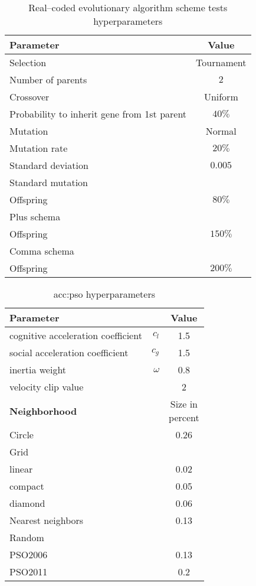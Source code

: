\begin{table}[h]
    \centering
    \begin{tabular}{|l|c|}
        \hline
        \textbf{Parameter} & \textbf{Value} \\
        \hline
        Selection & Tournament \\
        \quad Number of parents & $2$ \\
        Crossover & Uniform \\
        \quad Probability to inherit gene from 1st parent & $40\%$ \\
        Mutation & Normal \\
        \quad Mutation rate & $20\%$ \\
        \quad Standard deviation & $0.005$ \\
        \hline
        Standard mutation & \\
        \quad Offspring & $80\%$ \\
        Plus schema & \\
        \quad Offspring & $150\%$ \\
        Comma schema & \\
        \quad Offspring & $200\%$ \\
        \hline
    \end{tabular}
    \caption{Real--coded evolutionary algorithm scheme tests hyperparameters}
    \label{tab:esschemehyperparmarameters}
\end{table}

\begin{table}[h]
    \centering
    \begin{tabular}{|l r|c|}
        \hline
        \multicolumn{2}{|l|}{\textbf{Parameter}} & \textbf{Value} \\
        \hline
        cognitive acceleration coefficient & $c_l$ & 1.5 \\
        social acceleration coefficient  & $c_g$ & 1.5 \\
        inertia weight & $\omega$ & 0.8 \\
        velocity clip value & & 2 \\
        \hline \hline
        \textbf{Neighborhood} & & \makecell[c]{Size in\\ percent} \\
        \hline
        Circle & & 0.26 \\
        Grid & & \\
        \quad linear & & 0.02 \\
        \quad compact & & 0.05 \\
        \quad diamond & & 0.06 \\
        Nearest neighbors & & 0.13 \\
        Random & & \\
        \quad PSO2006 & & 0.13 \\
        \quad PSO2011 & & 0.2 \\ 
        \hline
    \end{tabular}
    \caption{\acrlong*{acc:pso} hyperparameters}
    \label{tab:psohyperparameters}
\end{table}